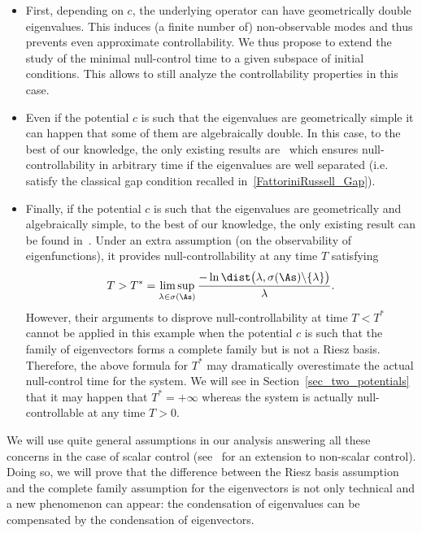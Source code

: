 \begin{itemize}
\item First, depending on $c$, the underlying operator can have geometrically double eigenvalues. This induces (a finite number of) non-observable modes and thus prevents even approximate controllability. We thus propose to extend the study of the minimal null-control time to a given subspace of initial conditions. This allows to still analyze the controllability properties in this case.
\item Even if the potential $c$ is such that the eigenvalues are geometrically simple it can happen that some of them are algebraically double. In this case, to the best of our knowledge, the only existing results are~\cite{AKBGBDT_Kalman,FCGBdT:2010} which ensures null-controllability in arbitrary time if the eigenvalues are well separated (i.e. satisfy the classical gap condition recalled in~\eqref{FattoriniRussell_Gap}).
\item Finally, if the potential $c$ is such that the eigenvalues are geometrically and algebraically simple, to the best of our knowledge, the only existing result can be found in~\cite{AmmarKhodjaBenabdallahGonzalez-BurgosdeTeresa:2014}. Under an extra assumption (on the observability of eigenfunctions), it provides null-controllability at any time $T$ satisfying
\[
T > T^* = \limsup_{ \lambda \in \sigma(\As)} \frac{ -\ln \dist\big(\lambda, \sigma(\As) \backslash \{ \lambda \} \big)}{\lambda}.
\]
However, their arguments to disprove null-controllability at time $T < T^*$ cannot be applied in this example when the potential $c$ is such that the family of eigenvectors forms a complete family but is not a Riesz basis. Therefore, the above formula for $T^*$ may dramatically overestimate the actual null-control time for the system. We will see in Section~\ref{sec_two_potentials} that it may happen that $T^*=+\infty$ whereas the system is actually null-controllable at any time $T>0$.
\end{itemize}

We will use quite general assumptions in our analysis answering all these concerns in the case of scalar control (see~\cite{BoyerMorancey} for an extension to non-scalar control). Doing so, we will prove that the difference between the Riesz basis assumption and the complete family assumption for the eigenvectors is not only technical and a new phenomenon can appear: the condensation of eigenvalues can be compensated by the condensation of eigenvectors.

